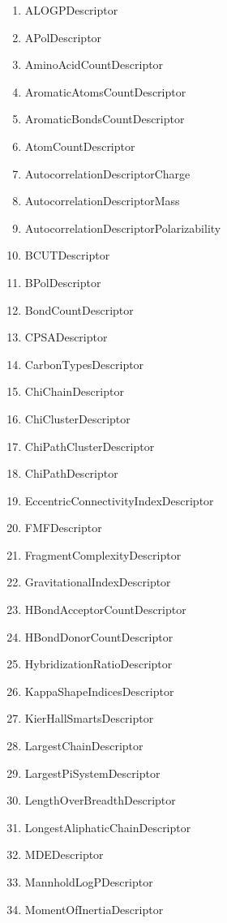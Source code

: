 \documentclass[11pt,a4paper]{article}
\begin{document}
\begin{table}[ht]\small
\centering
\begin{multicols}{2}
\begin{enumerate}
\item   ALOGPDescriptor
\item   APolDescriptor
\item   AminoAcidCountDescriptor
\item   AromaticAtomsCountDescriptor
\item   AromaticBondsCountDescriptor
\item   AtomCountDescriptor
\item   AutocorrelationDescriptorCharge
\item   AutocorrelationDescriptorMass
\item   AutocorrelationDescriptorPolarizability
\item   BCUTDescriptor
\item   BPolDescriptor
\item   BondCountDescriptor
\item   CPSADescriptor
\item   CarbonTypesDescriptor
\item   ChiChainDescriptor
\item   ChiClusterDescriptor
\item   ChiPathClusterDescriptor
\item   ChiPathDescriptor
\item   EccentricConnectivityIndexDescriptor
\item   FMFDescriptor
\item   FragmentComplexityDescriptor
\item   GravitationalIndexDescriptor
\item   HBondAcceptorCountDescriptor
\item   HBondDonorCountDescriptor
\item   HybridizationRatioDescriptor
\item   KappaShapeIndicesDescriptor
\item   KierHallSmartsDescriptor
\item   LargestChainDescriptor
\item   LargestPiSystemDescriptor
\item   LengthOverBreadthDescriptor
\item   LongestAliphaticChainDescriptor
\item   MDEDescriptor
\item   MannholdLogPDescriptor
\item   MomentOfInertiaDescriptor

\end{enumerate}
\end{multicols}
\end{table}
\end{document}
